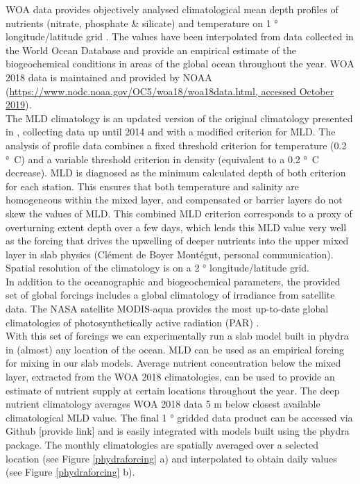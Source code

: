 WOA data provides objectively analysed climatological mean depth profiles of nutrients (nitrate, phosphate \& silicate) and temperature on 1 \unit{°} longitude/latitude grid \cite{Garcia2019WORLDSilicate}. The values have been interpolated from data collected in the World Ocean Database and provide an empirical estimate of the biogeochemical conditions in areas of the global ocean throughout the year. WOA 2018 data is maintained and provided by NOAA (\url{https://www.nodc.noaa.gov/OC5/woa18/woa18data.html, accessed October 2019}).\\

The MLD climatology is an updated version of the original climatology presented in  \citet{deBoyerMontegut2004MixedClimatology}, collecting data up until 2014 and with a modified criterion for MLD. The analysis of profile data combines a fixed threshold criterion for temperature (0.2 \unit{°C}) and a variable threshold criterion in density (equivalent to a 0.2 \unit{°C} decrease). MLD is diagnosed as the minimum calculated depth of both criterion for each station. This ensures that both temperature and salinity are homogeneous within the mixed layer, and compensated or barrier layers do not skew the values of MLD. This combined MLD criterion corresponds to a proxy of overturning extent depth over a few days, which lends this MLD value very well as the forcing that drives the upwelling of deeper nutrients into the upper mixed layer in slab physics (Clément de Boyer Montégut, personal communication). Spatial resolution of the climatology is on a 2 \unit{°} longitude/latitude grid.\\

In addition to the oceanographic and biogeochemical parameters, the provided set of global forcings includes a global climatology of irradiance from satellite data. The NASA satellite MODIS-aqua provides the most up-to-date global climatologies of photosynthetically active radiation (PAR) \cite{MODIS-Aqua2018NASAGroup}. 
\\
With this set of forcings we can experimentally run a slab model built in phydra in (almost) any location of the ocean. MLD can be used as an empirical forcing for mixing in our slab models. Average nutrient concentration below the mixed layer, extracted from the WOA 2018 climatologies, can be used to provide an estimate of nutrient supply at certain locations throughout the year. The deep nutrient climatology averages WOA 2018 data 5 \unit{m} below closest available climatological MLD value. The final 1 \unit{°} gridded data product can be accessed via Github [provide link] and is easily integrated with models built using the phydra package. 
The monthly climatologies are spatially averaged over a selected location (see Figure \ref{phydraforcing} a) and interpolated to obtain daily values (see Figure \ref{phydraforcing} b).






